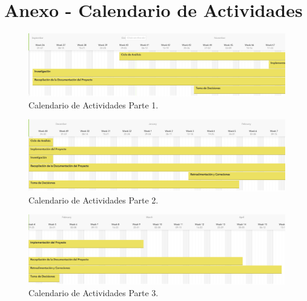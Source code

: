 \chapter{Anexo - Calendario de Actividades} 

\begin{figure}[h!]
  \centering
    \includegraphics[width=1\textwidth]{Images/ActividadesP1}
    \caption{ Calendario de Actividades Parte 1.}
\end{figure}
\begin{figure}[h!]
  \centering
    \includegraphics[width=1\textwidth]{Images/ActividadesP2}
    \caption{ Calendario de Actividades Parte 2.}
\end{figure}
\begin{figure}[h!]
  \centering
    \includegraphics[width=1\textwidth]{Images/ActividadesP3}
    \caption{ Calendario de Actividades Parte 3. }
\end{figure}